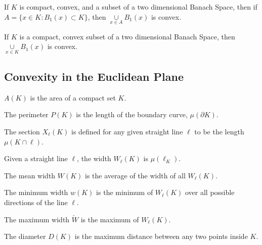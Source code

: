 \documentclass[crop=false,class=book,oneside]{standalone}
\begin{document}
            \begin{theorem}
            If $K$ is compact, convex, and a subset of a two dimensional Banach Space, then if $A = \{x\in K:B_{1}(x)\subset K\}$, then $\underset{x\in A}\cup B_{1}(x)$ is convex.
            \end{theorem}
            \begin{theorem}
            If $K$ is a compact, convex subset of a two dimensional Banach Space, then $\underset{x\in K}\cup B_{1}(x)$ is convex.
            \end{theorem}
        \subsection{Convexity in the Euclidean Plane}
            \begin{definition}
            $A(K)$ is the area of a compact set $K$.
            \end{definition}
            \begin{definition}
            The perimeter $P(K)$ is the length of the boundary curve, $\mu(\partial K)$.
            \end{definition}
            \begin{definition}
            The section $X_{\ell}(K)$ is defined for any given straight line $\ell$ to be the length $\mu(K\cap \ell)$.
            \end{definition}
            \begin{definition}
            Given a straight line $\ell$, the width $W_{\ell}(K)$ is $\mu(\ell_{K})$.
            \end{definition}
            \begin{definition}
            The mean width $W(K)$ is the average of the width of all $W_{\ell}(K)$.
            \end{definition}
            \begin{definition}
            The minimum width $w(K)$ is the minimum of $W_{\ell}(K)$ over all possible directions of the line $\ell$.
            \end{definition}
            \begin{definition}
            The maximum width $\check{W}$ is the maximum of $W_{\ell}(K)$.
            \end{definition}
            \begin{definition}
            The diameter $D(K)$ is the maximum distance between any two points inside $K$.
            \end{definition}
\end{document}
